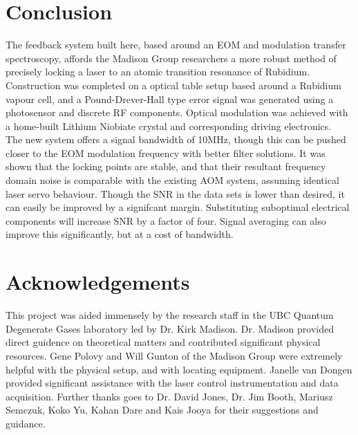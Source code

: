 \newpage
\section{Conclusion}

The feedback system built here, based around an EOM and modulation transfer spectroscopy, affords the Madison Group researchers a more robust method of precisely locking a laser to an atomic transition resonance of Rubidium. \\

Construction was completed on a optical table setup based around a Rubidium vapour cell, and a Pound-Drever-Hall type error signal was generated using a photosensor and discrete RF components. Optical modulation was achieved with a home-built Lithium Niobiate crystal and corresponding driving electronics.\\

The new system offers a signal bandwidth of 10MHz, though this can be pushed closer to the EOM modulation frequency with better filter solutions. It was shown that the locking points are stable, and that their resultant frequency domain noise is comparable with the existing AOM system, assuming identical laser servo behaviour. Though the SNR in the data sets is lower than desired, it can easily be improved by a signifcant margin. Substituting suboptimal electrical components will increase SNR by a factor of four. Signal averaging can also improve this significantly, but at a cost of bandwidth. \\

\section*{Acknowledgements}

This project was aided immensely by the research staff in the UBC Quantum Degenerate Gases laboratory led by Dr. Kirk Madison. Dr. Madison provided direct guidence on theoretical matters and contributed significant physical resources. Gene Polovy and Will Gunton of the Madison Group were extremely helpful with the physical setup, and with locating equipment. Janelle van Dongen provided significant assistance with the laser control instrumentation and data acquisition. Further thanks goes to Dr. David Jones, Dr. Jim Booth, Mariusz Semczuk, Koko Yu, Kahan Dare and Kais Jooya for their suggestions and guidance.